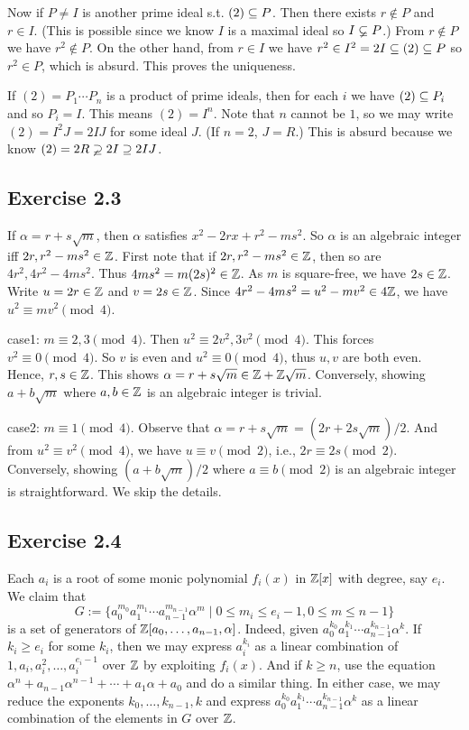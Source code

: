 \documentclass[../Marcus.tex]{subfiles}
\begin{document}
Now if $P\neq I$ is another prime ideal s.t. $(2)\subseteq P$. Then there exists $r\notin P$ and $r\in I$. (This is possible since we know $I$ is a maximal ideal so $I\varsubsetneq P$.) From $r\notin P$ we have $r^2\notin P$. On the other hand, from $r\in I$ we have $r^2\in I^2=2I \subseteq (2)\subseteq P$ so $r^2\in P$, which is absurd. This proves the uniqueness.

If $(2)=P_1\cdots P_n$ is a product of prime ideals, then for each $i$ we have $(2)\subseteq P_i$ and so $P_i=I$. This means $(2)=I^n$. Note that $n$ cannot be $1$, so we may write $(2)=I^2J=2IJ$ for some ideal $J$. (If $n=2$, $J=R$.) This is absurd because we know $(2)=2R\varsupsetneq 2I \supseteq 2IJ$.

\subsection*{Exercise 2.3}

If $\alpha=r+s\sqrt{m}$, then $\alpha$ satisfies $x^2-2rx+r^2-ms^2$. So $\alpha$ is an algebraic integer iff $2r,r^2-ms^2\in\mathbb{Z}$. First note that if $2r,r^2-ms^2\in\mathbb{Z}$, then so are $4r^2,4r^2-4ms^2$. Thus $4ms^2=m(2s)^2\in\mathbb{Z}$. As $m$ is square-free, we have $2s\in\mathbb{Z}$. Write $u=2r\in\mathbb{Z}$ and $v=2s\in\mathbb{Z}$. Since $4r^2-4ms^2=u^2-mv^2\in 4\mathbb{Z}$, we have $u^2 \equiv mv^2 \pmod{4}$.

case1: $m \equiv 2,3 \pmod{4}$. Then $u^2 \equiv 2v^2,3v^2 \pmod{4}$. This forces $v^2 \equiv 0 \pmod{4}$. So $v$ is even and $u^2 \equiv 0 \pmod{4}$, thus $u,v$ are both even. Hence, $r,s\in \mathbb{Z}$. This shows $\alpha=r+s\sqrt{m}\in \mathbb{Z}+\mathbb{Z}\sqrt{m}$. Conversely, showing $a+b\sqrt{m}$ where $a,b\in\mathbb{Z}$ is an algebraic integer is trivial.

case2: $m \equiv 1 \pmod{4}$. Observe that $\alpha=r+s\sqrt{m}=(2r+2s\sqrt{m})/2$. And from $u^2 \equiv v^2 \pmod{4}$, we have $u \equiv v \pmod{2}$, i.e., $2r \equiv 2s \pmod{2}$. Conversely, showing $(a+b\sqrt{m})/2$ where $a \equiv b \pmod{2}$ is an algebraic integer is straightforward. We skip the details.

\subsection*{Exercise 2.4}

Each $a_i$ is a root of some monic polynomial $f_i(x)$ in $\mathbb{Z}[x]$ with degree, say $e_i$. We claim that $$G:=\{a_0^{m_0}a_1^{m_1}\cdots a_{n-1}^{m_{n-1}}\alpha^m \mid 0\leq m_i \leq e_i-1,0\leq m\leq n-1\}$$ is a set of generators of $\mathbb{Z}[a_0,\ldots,a_{n-1},\alpha]$. Indeed, given $a_0^{k_0}a_1^{k_1}\cdots a_{n-1}^{k_{n-1}}\alpha^k$. If $k_i\geq e_i$ for some $k_i$, then we may express $a_i^{k_i}$ as a linear combination of $1,a_i,a_i^2,\ldots,a_i^{e_i-1}$ over $\mathbb{Z}$ by exploiting $f_i(x)$. And if $k\geq n$, use the equation $\alpha^n+a_{n-1}\alpha^{n-1}+\cdots+a_1\alpha+a_0$ and do a similar thing. In either case, we may reduce the exponents $k_0,\ldots,k_{n-1},k$ and express $a_0^{k_0}a_1^{k_1}\cdots a_{n-1}^{k_{n-1}}\alpha^k$ as a linear combination of the elements in $G$ over $\mathbb{Z}$.
\end{document}
